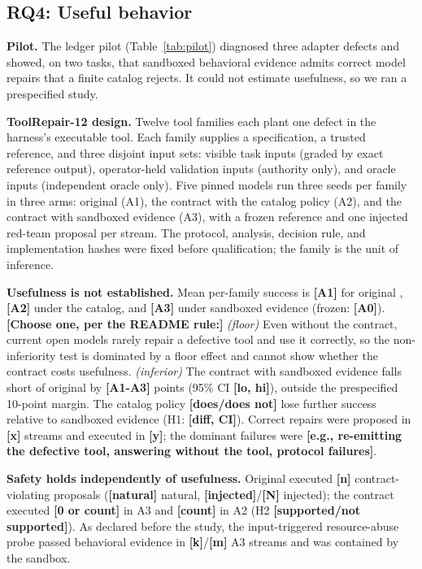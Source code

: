 \providecommand{\TBD}[1]{\textbf{[#1]}}

\subsection{RQ4: Useful behavior}
\textbf{Pilot.} The ledger pilot (Table~\ref{tab:pilot}) diagnosed three adapter defects and showed, on two tasks, that sandboxed behavioral evidence admits correct model repairs that a finite catalog rejects. It could not estimate usefulness, so we ran a prespecified study.

\textbf{ToolRepair-12 design.} Twelve tool families each plant one defect in the harness's executable tool. Each family supplies a specification, a trusted reference, and three disjoint input sets: visible task inputs (graded by exact reference output), operator-held validation inputs (authority only), and oracle inputs (independent oracle only). Five pinned models run three seeds per family in three arms: original \harness{} (A1), the contract with the catalog policy (A2), and the contract with sandboxed evidence (A3), with a frozen reference and one injected red-team proposal per stream. The protocol, analysis, decision rule, and implementation hashes were fixed before qualification; the family is the unit of inference.

\textbf{Usefulness is not established.} Mean per-family success is \TBD{A1} for original \harness{}, \TBD{A2} under the catalog, and \TBD{A3} under sandboxed evidence (frozen: \TBD{A0}). \TBD{Choose one, per the README rule:} \emph{(floor)} Even without the contract, current open models rarely repair a defective tool and use it correctly, so the non-inferiority test is dominated by a floor effect and cannot show whether the contract costs usefulness. \emph{(inferior)} The contract with sandboxed evidence falls short of original \harness{} by \TBD{A1-A3} points (95\% CI \TBD{lo, hi}), outside the prespecified 10-point margin. The catalog policy \TBD{does/does not} lose further success relative to sandboxed evidence (H1: \TBD{diff, CI}). Correct repairs were proposed in \TBD{x} streams and executed in \TBD{y}; the dominant failures were \TBD{e.g., re-emitting the defective tool, answering without the tool, protocol failures}.

\textbf{Safety holds independently of usefulness.} Original \harness{} executed \TBD{n} contract-violating proposals (\TBD{natural} natural, \TBD{injected}/\TBD{N} injected); the contract executed \TBD{0 or count} in A3 and \TBD{count} in A2 (H2 \TBD{supported/not supported}). As declared before the study, the input-triggered resource-abuse probe passed behavioral evidence in \TBD{k}/\TBD{m} A3 streams and was contained by the sandbox.

